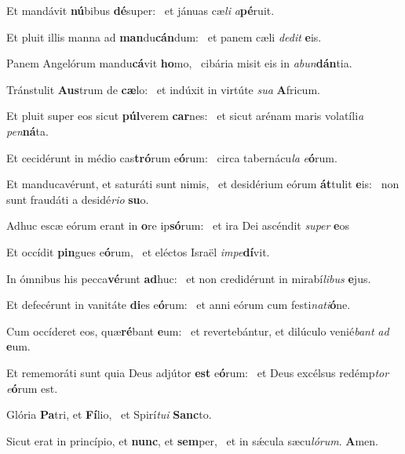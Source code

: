 \item Et mandávit \textbf{nú}bibus \textbf{dé}super:~\psstar{} et jánuas cæ\textit{li} \textit{a}\textbf{pé}ruit.

\item Et pluit illis manna ad \textbf{man}du\textbf{cán}dum:~\psstar{} et panem cæli \textit{dedit} \textbf{e}is.

\item Panem Angelórum mandu\textbf{cá}vit \textbf{ho}mo,~\psstar{} cibária misit eis in \textit{abun}\textbf{dán}tia.

\item Tránstulit \textbf{Aus}trum de \textbf{cæ}lo:~\psstar{} et indúxit in virtúte \textit{sua} \textbf{A}fricum.

\item Et pluit super eos sicut \textbf{púl}verem \textbf{car}nes:~\psstar{} et sicut arénam maris volatíli\textit{a} \textit{pen}\textbf{ná}ta.

\item Et cecidérunt in médio cas\textbf{tró}rum e\textbf{ó}rum:~\psstar{} circa tabernácu\textit{la} \textit{e}\textbf{ó}rum.

\item Et manducavérunt, et saturáti sunt nimis,~\pscross{} et desidérium eórum \textbf{át}tulit \textbf{e}is:~\psstar{} non sunt fraudáti a desidé\textit{rio} \textbf{su}o.

\item Adhuc escæ eórum erant in \textbf{o}re ip\textbf{só}rum:~\psstar{} et ira Dei ascéndit \textit{super} \textbf{e}os

\item Et occídit \textbf{pin}gues e\textbf{ó}rum,~\psstar{} et eléctos Israël \textit{impe}\textbf{dí}vit.

\item In ómnibus his pecca\textbf{vé}runt \textbf{ad}huc:~\psstar{} et non credidérunt in mirabí\textit{libus} \textbf{e}jus.

\item Et defecérunt in vanitáte \textbf{di}es e\textbf{ó}rum:~\psstar{} et anni eórum cum festi\textit{nati}\textbf{ó}ne.

\item Cum occíderet eos, quæ\textbf{ré}bant \textbf{e}um:~\psstar{} et revertebántur, et dilúculo venié\textit{bant} \textit{ad} \textbf{e}um.

\item Et rememoráti sunt quia Deus adjútor \textbf{est} e\textbf{ó}rum:~\psstar{} et Deus excélsus redémp\textit{tor} \textit{e}\textbf{ó}rum est.

\item Glória \textbf{Pa}tri, et \textbf{Fí}lio,~\psstar{} et Spirí\textit{tui} \textbf{Sanc}to.

\item Sicut erat in princípio, et \textbf{nunc}, et \textbf{sem}per,~\psstar{} et in sǽcula sæcu\textit{lórum}. \textbf{A}men.